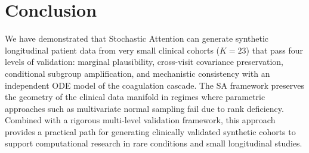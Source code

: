 \section{Conclusion}
\label{sec:conclusion}

We have demonstrated that Stochastic Attention can generate synthetic longitudinal
patient data from very small clinical cohorts ($K{=}23$) that pass four levels of
validation: marginal plausibility, cross-visit covariance preservation, conditional
subgroup amplification, and mechanistic consistency with an independent ODE model of
the coagulation cascade. The SA framework preserves the geometry of the clinical data
manifold in regimes where parametric approaches such as multivariate normal sampling
fail due to rank deficiency. Combined with a rigorous multi-level validation framework,
this approach provides a practical path for generating clinically validated synthetic
cohorts to support computational research in rare conditions and small longitudinal
studies.

